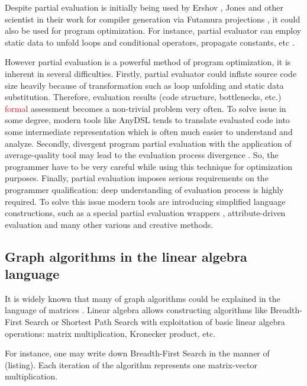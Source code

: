\documentclass[conference]{IEEEtran}
\begin{document}
Despite partial evaluation is initially being used by Ershov \cite{ershov1982mixed}, Jones \cite{jones1993partial} and other scientist in their work for compiler generation via Futamura projections \cite{futamura1983partial}, it could also be used for program optimization. For instance, partial evaluator can employ static data to unfold loops and conditional operators, propagate constants, etc \cite{jones1993partial}. 

However partial evaluation is a powerful method of program optimization, it is inherent in several difficulties. Firstly, partial evaluator could inflate source code size heavily because of transformation such as loop unfolding and static data substitution. Therefore, evaluation results (code structure, bottlenecks, etc.) \textcolor{red}{formal} assessment becomes a non-trivial problem very often. To solve issue in some degree, modern tools like AnyDSL \cite{leissa2018anydsl} tends to translate evaluated code into some intermediate representation which is often much easier to understand and analyze. Secondly, divergent program partial evaluation with the application of average-quality tool may lead to the evaluation process divergence \cite{jones1993partial}. So, the programmer have to be very careful while using this technique for optimization purposes. Finally, partial evaluation imposes serious requirements on the programmer qualification: deep understanding of evaluation process is highly required. To solve this issue modern tools are introducing simplified language constructions, such as a special partial evaluation wrappers \cite{leissa2018anydsl}, attribute-driven evaluation \cite{10.1007/978-3-319-74313-4_27} and many other various and creative methods.

\subsection{Graph algorithms in the linear algebra language}

It is widely known that many of graph algorithms could be explained in the language of matrices \cite{kepner2011graph,davis2019algorithm}. Linear algebra allows constructing algorithms like Breadth-First Search or Shortest Path Search with exploitation of basic linear algebra operations: matrix multiplication, Kronecker product, etc. 

For instance, one may write down Breadth-First Search in the manner of (listing). Each iteration of the algorithm represents one matrix-vector multiplication.
\bigskip
\end{document}
